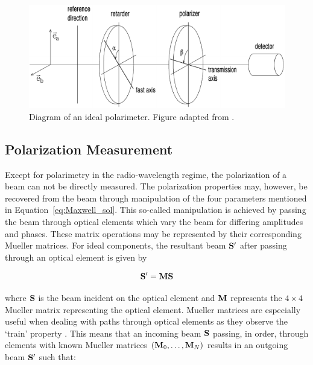 
\begin{figure}[t]
  \centering
  \includegraphics[width=1\textwidth]{figures/2_polarimeter.pdf}
  \caption{Diagram of an ideal polarimeter. Figure adapted from \cite{pol_in_spectra}.}
  \label{fig:polarimeter}
\end{figure}


\subsection{Polarization Measurement}\label{subsec:pol_measure}

Except for polarimetry in the radio-wavelength regime, the polarization of a beam can not be directly measured. The polarization properties may, however, be recovered from the beam through manipulation of the four parameters mentioned in Equation~\ref{eq:Maxwell_sol}. This so-called manipulation is achieved by passing the beam through optical elements which vary the beam for differing amplitudes and phases. These matrix operations may be represented by their corresponding Mueller matrices. For ideal components, the resultant beam $\mathbf{S}^{\prime}$ after passing through an optical element is given by

\begin{equation}
  \mathbf{S}^{\prime} = \mathbf{M} \mathbf{S}
\end{equation}

\noindent where $\mathbf{S}$ is the beam incident on the optical element and $\mathbf{M}$ represents the $4 \times 4$ Mueller matrix representing the optical element. Mueller matrices are especially useful when dealing with paths through optical elements as they observe the `train' property \citep{Mueller_train}. This means that an incoming beam $\mathbf{S}$ passing, in order, through elements with known Mueller matrices $(\mathbf{M}_{0}, \dots, \mathbf{M}_{N})$ results in an outgoing beam $\mathbf{S}^{\prime}$ such that:

